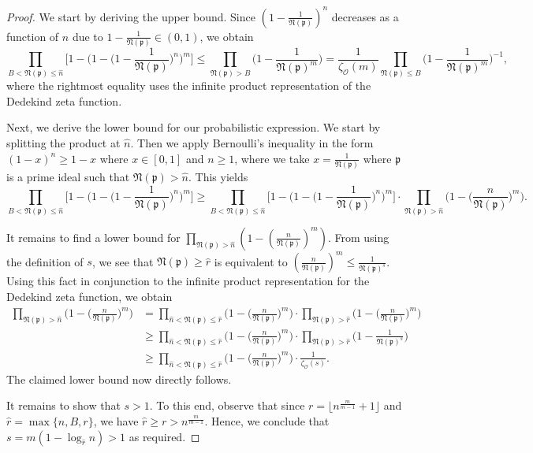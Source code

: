 \documentclass[10pt,a4paper]{article}
\newcommand{\f}[1]{\mathfrak{#1}}
\begin{document}
	\begin{proof}
		We start by deriving the upper bound. Since $(1 - \frac{1}{\f{N}(\f{p})})^n$ decreases as a function of $n$ due to $1 - \frac{1}{\f{N}(\f{p})} \in (0, 1)$, we obtain
		$$\prod_{B<\f{N}(\f{p})\leq\hat{n}} \Big[1 - \Big(1 - \Big(1 - \frac{1}{\f{N}(\f{p})}\Big)^n \Big)^m \Big] \leq \prod_{\f{N}(\f{p})>B} \Big(1 - \frac{1}{\f{N}(\f{p})^m}\Big) = \frac{1}{\zeta_\mathcal{O}(m)} \prod_{\f{N}(\f{p})\leq B} \Big(1 - \frac{1}{\f{N}(\f{p})^m}\Big)^{-1},$$
		where the rightmost equality uses the infinite product representation of the Dedekind zeta function.
		
		\vspace{.1 in}
		
		Next, we derive the lower bound for our probabilistic expression. We start by splitting the product at $\hat{n}$. Then we apply Bernoulli's inequality in the form $(1 - x)^n \geq 1 - x$ where $x \in [0, 1]$ and $n \geq 1$, where we take $x = \frac{1}{\f{N}(\f{p})}$ where $\f{p}$ is a prime ideal such that $\f{N}(\f{p}) > \hat{n}$. This yields 
		$$\prod_{B<\f{N}(\f{p})\leq\hat{n}} \Big[1 - \Big(1 - \Big(1 - \frac{1}{\f{N}(\f{p})}\Big)^n \Big)^m \Big] \geq \prod_{B<\f{N}(\f{p})\leq \hat{n}}\Big[1 - \Big(1 - \Big(1 - \frac{1}{\f{N}(\f{p})}\Big)^n \Big)^m \Big] \cdot \prod_{\f{N}(\f{p})>\hat{n}}\Big(1 - \Big(\frac{n}{\f{N}(\f{p})}\Big)^m\Big).$$
		
		\vspace{.1 in}
		
		It remains to find a lower bound for $\prod_{\f{N}(\f{p})>\hat{n}} (1 - (\frac{n}{\f{N}(\f{p})})^m)$. From using the definition of $s$, we see that $\f{N}(\f{p}) \geq \hat{r}$ is equivalent to $(\frac{n}{\f{N}(\f{p})})^m \leq \frac{1}{\f{N}(\f{p})^s}$. Using this fact in conjunction to the infinite product representation for the Dedekind zeta function, we obtain 
		\begin{align*} \prod_{\f{N}(\f{p})>\hat{n}}\Big(1 - \Big(\frac{n}{\f{N}(\f{p})}\Big)^m\Big) &= \prod_{\hat{n}< \f{N}(\f{p}) \leq \hat{r}}\Big(1 - \Big(\frac{n}{\f{N}(\f{p})}\Big)^m\Big) \cdot \prod_{\f{N}{(\f{p})}>\hat{r}}\Big(1 - \Big(\frac{n}{\f{N}(\f{p})}\Big)^m\Big)\\ &\geq  \prod_{\hat{n}< \f{N}(\f{p}) \leq \hat{r}}\Big(1 - \Big(\frac{n}{\f{N}(\f{p})}\Big)^m\Big) \cdot \prod_{\f{N}(\f{p})>\hat{r}}\Big(1 - \frac{1}{\f{N}(\f{p})^s}\Big)\\ &\geq  \prod_{\hat{n}< \f{N}(\f{p}) \leq \hat{r}}\Big(1 - \Big(\frac{n}{\f{N}(\f{p})}\Big)^m\Big) \cdot \frac{1}{\zeta_\mathcal{O}(s)}. \end{align*}
		The claimed lower bound now directly follows. 
		
		\vspace{.1 in}
		
		It remains to show that $s > 1$. To this end, observe that since $r=\lfloor n^{\frac{m}{m-1}}+1\rfloor$ and $\hat{r} = \max\{n, B, r\}$, we have $\hat{r} \geq r > n^{\frac{m}{m-1}}$. Hence, we conclude that $s = m(1 - \log_{\hat{r}}{n}) > 1$ as required.
	\end{proof}
	
\end{document}
